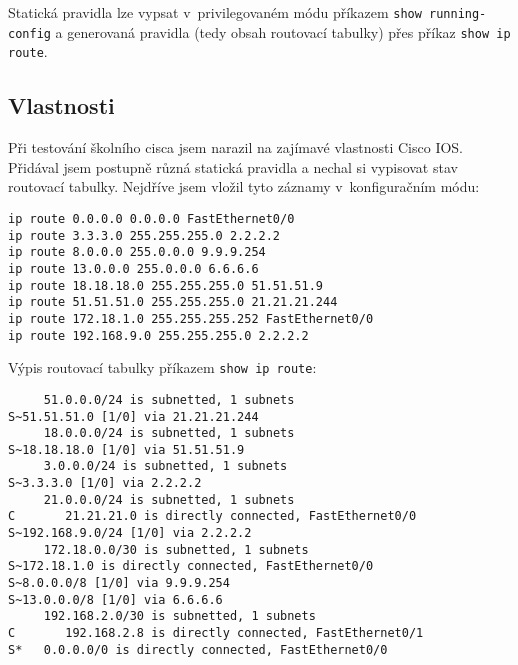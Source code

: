 Statická pravidla lze vypsat v~privilegovaném módu příkazem \verb|show running-config| a generovaná pravidla (tedy obsah routovací tabulky) přes příkaz \verb|show ip route|.

\subsection{Vlastnosti}
Při testování školního cisca jsem narazil na zajímavé vlastnosti Cisco IOS. Přidával jsem postupně různá statická pravidla a nechal si vypisovat stav routovací tabulky.
Nejdříve jsem vložil tyto záznamy v~konfiguračním módu:
\begin{verbatim}
ip route 0.0.0.0 0.0.0.0 FastEthernet0/0
ip route 3.3.3.0 255.255.255.0 2.2.2.2
ip route 8.0.0.0 255.0.0.0 9.9.9.254
ip route 13.0.0.0 255.0.0.0 6.6.6.6
ip route 18.18.18.0 255.255.255.0 51.51.51.9
ip route 51.51.51.0 255.255.255.0 21.21.21.244
ip route 172.18.1.0 255.255.255.252 FastEthernet0/0
ip route 192.168.9.0 255.255.255.0 2.2.2.2
\end{verbatim}

Výpis routovací tabulky příkazem \verb|show ip route|:
\begin{verbatim}
     51.0.0.0/24 is subnetted, 1 subnets
S~51.51.51.0 [1/0] via 21.21.21.244
     18.0.0.0/24 is subnetted, 1 subnets
S~18.18.18.0 [1/0] via 51.51.51.9
     3.0.0.0/24 is subnetted, 1 subnets
S~3.3.3.0 [1/0] via 2.2.2.2
     21.0.0.0/24 is subnetted, 1 subnets
C       21.21.21.0 is directly connected, FastEthernet0/0
S~192.168.9.0/24 [1/0] via 2.2.2.2
     172.18.0.0/30 is subnetted, 1 subnets
S~172.18.1.0 is directly connected, FastEthernet0/0
S~8.0.0.0/8 [1/0] via 9.9.9.254
S~13.0.0.0/8 [1/0] via 6.6.6.6
     192.168.2.0/30 is subnetted, 1 subnets
C       192.168.2.8 is directly connected, FastEthernet0/1
S*   0.0.0.0/0 is directly connected, FastEthernet0/0
\end{verbatim} 

